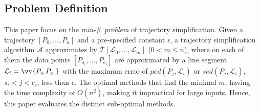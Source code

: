 \subsection{Problem Definition}
This paper focus on the \emph{min-$\#$ problem} \cite{Chan:Optimal, Imai:Optimal,Pavlidis:Segment} of trajectory simplification.
Given a trajectory $[P_0, \dots, P_n]$ and a pre-specified constant $\epsilon$, a trajectory simplification algorithm $\mathcal{A}$ approximates  by $\overline{\mathcal{T}}[\mathcal{L}_0, \ldots , \mathcal{L}_m]$ ($0< m \le n$), where on
each of them the data points $[P_{s_i}, \dots, P_{e_i}]$ are approximated by a line segment $\mathcal{L}_i = \vv{P_{s_i}P_{e_i}}$ with the maximum error of  $ped(P_j, \mathcal{L}_i)$ or $sed(P_j, \mathcal{L}_i)$, $s_i < j<e_i$,  less than $\epsilon$.
The optimal methods that find the minimal $m$, having the time complexity of $O(n^2)$\cite{Chan:Optimal},
making it impractical for large inputs\cite{Heckbert:Survey}.
Hence, this paper evaluates the distinct sub-optimal methods.

